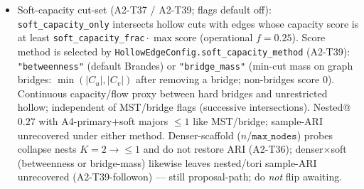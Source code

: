 \documentclass[11pt]{article}
\begin{document}
\begin{itemize}[leftmargin=1.5em]
  \texttt{HollowEdgeConfig.bridge\_critical\_only} /
  \texttt{hollow\_bridge\_critical\_only} intersects hollow cuts with
  \emph{graph-theoretic bridges} of the lifted undirected graph (edges whose
  removal increases the CC count). Bridges $\subseteq$ every spanning tree, so
  this is a stricter true cut-set than MST-critical; independent of
  \texttt{mst\_critical\_only} (both may apply as successive intersections).
  Nested@$0.27$ majors $\le 1$ like MST; multi-seed A4-primary$+$bridge sample
  ARI never recovers.
  \item Soft-capacity cut-set (A2-T37 / A2-T39; flags default off):
  \texttt{soft\_capacity\_only} intersects hollow cuts with edges whose
  capacity score is at least
  \texttt{soft\_capacity\_frac}${}\cdot\max\mathrm{score}$ (operational
  $f{=}0.25$). Score method is selected by
  \texttt{HollowEdgeConfig.soft\_capacity\_method} (A2-T39):
  \texttt{"betweenness"} (default Brandes) or \texttt{"bridge\_mass"}
  (min-cut mass on graph bridges:
  $\min(|C_u|,|C_v|)$ after removing a bridge; non-bridges score $0$).
  Continuous capacity/flow proxy between hard bridges and unrestricted
  hollow; independent of MST/bridge flags (successive intersections).
  Nested@$0.27$ with A4-primary$+$soft majors $\le 1$ like MST/bridge;
  sample-ARI unrecovered under either method. Denser-scaffold
  ($n$/$\texttt{max\_nodes}$) probes collapse nests $K{=}2\!\to\!\le 1$ and
  do not restore ARI (A2-T36); denser$\times$soft (betweenness or
  bridge-mass) likewise leaves nested/tori sample-ARI unrecovered
  (A2-T39-followon) --- still proposal-path; do \emph{not} flip awaiting.
\end{itemize}
\end{document}
